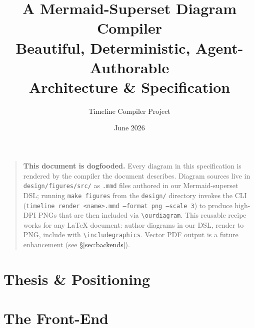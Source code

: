 \documentclass{MastersThesis}
\title{A Mermaid-Superset Diagram Compiler\\[0.5em]\Large Beautiful, Deterministic, Agent-Authorable\\[0.3em]\normalsize Architecture \& Specification}
\author{Timeline Compiler Project}
\date{June 2026}
\begin{document}
\maketitle

\begin{quote}
\textbf{This document is dogfooded.}
Every diagram in this specification is rendered by the compiler the document describes.
Diagram sources live in \texttt{design/figures/src/} as \texttt{.mmd} files authored in our Mermaid-superset DSL;
running \texttt{make figures} from the \texttt{design/} directory invokes the CLI
(\texttt{timeline render <name>.mmd --format png --scale 3}) to produce high-DPI PNGs that are
then included via \texttt{\textbackslash{}ourdiagram}.
This reusable recipe works for any \LaTeX{} document: author diagrams in our DSL,
render to PNG, include with \texttt{\textbackslash{}includegraphics}.
Vector PDF output is a future enhancement (see \S\ref{sec:backends}).
\end{quote}

\tableofcontents
\newpage


\part{Thesis \& Positioning}
\label{part:thesis}







\part{The Front-End}
\label{part:frontend}

\end{document}

